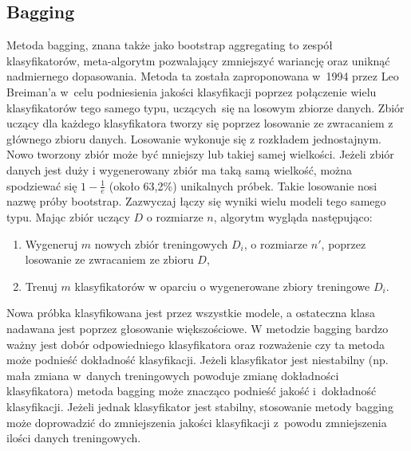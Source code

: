 \subsection{Bagging}
Metoda bagging, znana także jako bootstrap aggregating to zespół klasyfikatorów, meta-algorytm pozwalający zmniejszyć wariancję oraz uniknąć nadmiernego dopasowania. Metoda ta została zaproponowana w 1994 przez Leo Breiman’a w celu podniesienia jakości klasyfikacji poprzez połączenie wielu klasyfikatorów tego samego typu, uczących się na losowym zbiorze danych. Zbiór uczący dla każdego klasyfikatora tworzy się poprzez losowanie ze zwracaniem z głównego zbioru danych. Losowanie wykonuje się z rozkładem jednostajnym. Nowo tworzony zbiór może być mniejszy lub takiej samej wielkości. Jeżeli zbiór danych jest duży i wygenerowany zbiór ma taką samą wielkość, można spodziewać się $1-\frac{1}{e}$ (około 63,2\%) unikalnych próbek. Takie losowanie nosi nazwę próby bootstrap. Zazwyczaj łączy się wyniki wielu modeli tego samego typu. Mając zbiór uczący $D$ o rozmiarze $n$, algorytm wygląda następująco:
\begin{enumerate}
	\item Wygeneruj $m$ nowych zbiór treningowych $D_i$, o rozmiarze $n'$, poprzez losowanie ze zwracaniem ze zbioru $D$,
	\item Trenuj $m$ klasyfikatorów w oparciu o wygenerowane zbiory treningowe $D_i$.	
\end{enumerate}
Nowa próbka klasyfikowana jest przez wszystkie modele, a ostateczna klasa nadawana jest poprzez głosowanie większościowe.
W metodzie bagging bardzo ważny jest dobór odpowiedniego klasyfikatora oraz rozważenie czy ta metoda może podnieść dokładność klasyfikacji. Jeżeli klasyfikator jest niestabilny (np. mała zmiana w danych treningowych powoduje zmianę dokładności klasyfikatora) metoda bagging może znacząco podnieść jakość i dokładność klasyfikacji. Jeżeli jednak klasyfikator jest stabilny, stosowanie metody bagging może doprowadzić do zmniejszenia jakości klasyfikacji z powodu zmniejszenia ilości danych treningowych.
